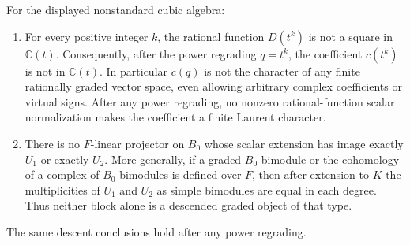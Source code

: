 \begin{proposition}
\label{prop:nonstandarddescent}
For the displayed nonstandard cubic algebra:
\begin{enumerate}
\item For every positive integer $k$, the rational function $D(t^k)$
is not a square in $\mathbb C(t)$. Consequently, after the power
regrading $q=t^k$, the coefficient $c(t^k)$ is not in
$\mathbb C(t)$. In particular $c(q)$ is not the character of any
finite rationally graded vector space, even allowing arbitrary
complex coefficients or virtual signs. After any power regrading,
no nonzero rational-function scalar normalization makes the
coefficient a finite Laurent character.
\item There is no $F$-linear projector on $B_0$ whose scalar
extension has image exactly $U_1$ or exactly $U_2$. More generally,
if a graded $B_0$-bimodule or the cohomology of a complex of
$B_0$-bimodules is defined over $F$, then after extension to $K$
the multiplicities of $U_1$ and $U_2$ as simple bimodules are equal
in each degree. Thus neither block alone is a descended graded
object of that type.
\end{enumerate}
The same descent conclusions hold after any power regrading.
\end{proposition}

